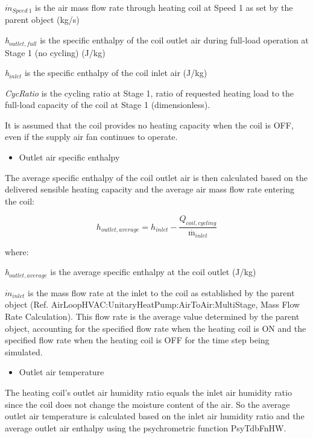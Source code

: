 \({\dot{m}_{Speed~1}}\) is the air mass flow rate through heating coil at Speed 1 as set by the parent object (kg/s)

\emph{h\(_{outlet,full}\)} is the specific enthalpy of the coil outlet air during full-load operation at Stage 1 (no cycling) (J/kg)

\emph{h\(_{inlet}\)} is the specific enthalpy of the coil inlet air (J/kg)

\emph{CycRatio} is the cycling ratio at Stage 1, ratio of requested heating load to the full-load capacity of the coil at Stage 1 (dimensionless).

It is assumed that the coil provides no heating capacity when the coil is OFF, even if the supply air fan continues to operate.

\begin{itemize}
  \item Outlet air specific enthalpy
\end{itemize}

The average specific enthalpy of the coil outlet air is then calculated based on the delivered sensible heating capacity and the average air mass flow rate entering the coil:

\begin{equation}
  h_{outlet,average} = h_{inlet} - \frac{Q_{coil,cycling}}{{\mathop m\limits^\cdot }_{inlet}}
\end{equation}

where:

\emph{h\(_{outlet,average}\)} is the average specific enthalpy at the coil outlet (J/kg)

\({\dot{m}_{inlet}}\) is the mass flow rate at the inlet to the coil as established by the parent object (Ref. AirLoopHVAC:UnitaryHeatPump:AirToAir:MultiStage, Mass Flow Rate Calculation). This flow rate is the average value determined by the parent object, accounting for the specified flow rate when the heating coil is ON and the specified flow rate when the heating coil is OFF for the time step being simulated.

\begin{itemize}
  \item Outlet air temperature
\end{itemize}

The heating coil's outlet air humidity ratio equals the inlet air humidity ratio since the coil does not change the moisture content of the air. So the average outlet air temperature is calculated based on the inlet air humidity ratio and the average outlet air enthalpy using the psychrometric function PsyTdbFnHW.

